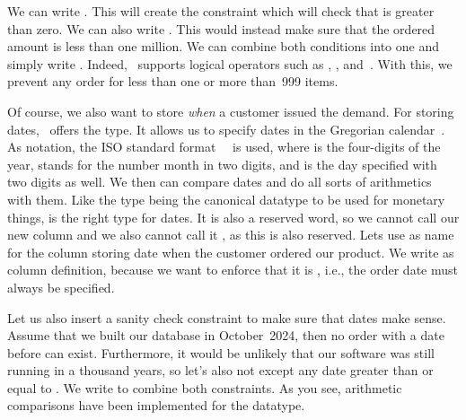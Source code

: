 We can write .
This will create the constraint  which will check that  is greater than zero.
We can also write .
This would instead make sure that the ordered amount is less than one million.
We can combine both conditions into one and simply write .
Indeed, \sql\ supports logical operators such as , , and~.
With this, we prevent any order for less than one or more than~999 items.

Of course, we also want to store \emph{when} a customer issued the demand.
For storing dates, \sql\ offers the  type.
It allows us to specify dates in the Gregorian calendar~\cite{PGDG:PD:HU,G1582IG}.
As notation, the ISO standard format~~\cite{ISO860112019} is used, where  is the four-digits of the year,  stands for the number month in two digits, and  is the day specified with two digits as well.
We then can compare dates and do all sorts of arithmetics with them.
Like the type  being the canonical datatype to be used for monetary things,  is the right type for dates.
It is also a reserved word, so we cannot call our new column  and we also cannot call it , as this is also reserved.
Lets use  as name for the column storing date when the customer ordered our product.
We write  as column definition, because we want to enforce that it is , i.e., the order date must always be specified.%
%
\begin{sloppypar}%
Let us also insert a sanity check constraint to make sure that dates make sense.
Assume that we built our database in October~2024, then no order with a date before  can exist.
Furthermore, it would be unlikely that our software was still running in a thousand years, so let's also not except any date greater than or equal to .
We write  to combine both constraints.
As you see, arithmetic comparisons have been implemented for the  datatype.%
\end{sloppypar}%
